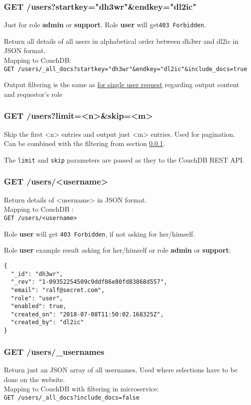 \subsubsection{GET /users?startkey="dh3wr"\&endkey="dl2ic"}
\label{protocoldef:microservicesapi:database:filterusername}
Just for role \textbf{admin} or \textbf{support}. Role \textbf{user} will get\verb|403 Forbidden|.

Return all details of all users in alphabetical order between dh3wr and dl2ic in JSON format.\\
Mapping to CouchDB:\\
\verb|GET /users/_all_docs?startkey="dh3wr"&endkey="dl2ic"&include_docs=true|

Output filtering is the same as \hyperref[protocoldef:microservicesapi:database:getusers]{for single user request} regarding output content and requestor's role

\subsubsection{GET /users?limit=<n>\&skip=<m>}
Skip the first <n> entries and output just <m> entries. Used for pagination. Can be combined with the filtering from section \ref{protocoldef:microservicesapi:database:filterusername}.

The \verb|limit| and \verb|skip| parameters are passed as they to the CouchDB REST API.

\subsubsection{GET /users/<username>}
\label{protocoldef:microservicesapi:database:getusername}
Return details of <username> in JSON format.\\
Mapping to CouchDB :\\
\verb|GET /users/<username>|

Role \textbf{user} will get \verb|403 Forbidden|, if not asking for her/himself.

Role \textbf{user} example result asking for her/himself or role \textbf{admin} or \textbf{support}:
\begin{lstlisting}
{
  "_id": "dh3wr",
  "_rev": "1-09352254509c9ddf86e80fd83868d557",
  "email": "ralf@secret.com",
  "role": "user",
  "enabled": true,
  "created_on": "2018-07-08T11:50:02.168325Z",
  "created_by": "dl2ic"
}
\end{lstlisting}


\subsubsection{GET /users/\_usernames}
Return just an JSON array of all usernames. Used where selections have to be done on the website.\\
Mapping to CouchDB with filtering in microservice:\\
\verb|GET /users/_all_docs?include_docs=false|

